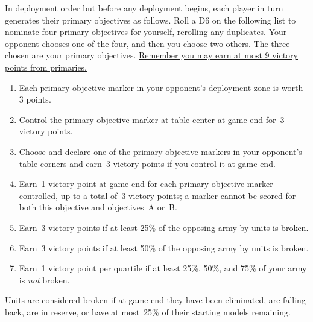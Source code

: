 \begin{scoring}  
\begin{primaries}

  In deployment order but before any deployment begins, each player in
  turn generates their primary objectives as follows.  Roll a D6 on
  the following list to nominate four primary objectives for yourself,
  rerolling any duplicates.  Your opponent chooses one of the four,
  and then you choose two others.  The three chosen are your primary
  objectives.  \underline{Remember you may earn at most 9 victory
    points from primaries.}

  \begin{enumerate}\shortlist
  \item Each primary objective marker in your opponent's deployment
    zone is worth 3 points.

  \item Control the primary objective marker at table center at game
    end for~3 victory points.

  \item Choose and declare one of the primary objective markers in
    your opponent's table corners and earn~3 victory points if you
    control it at game end.

  \item Earn~1 victory point at game end for each primary objective
    marker controlled, up to a total of~3 victory points; a marker
    cannot be scored for both this objective and objectives~A or~B.

  \item Earn~3 victory points if at least 25\% of the opposing army by
    units is broken.

  \item Earn~3 victory points if at least 50\% of the opposing army by
    units is broken.

  \item Earn~1 victory point per quartile if at least 25\%, 50\%, and
    75\% of your army is \emph{not} broken.
  \end{enumerate}

  Units are considered broken if at game end they have been
  eliminated, are falling back, are in reserve, or have at most~25\%
  of their starting models remaining.
\end{primaries}

\begin{secondaries}
\interrogation
\seekanddestroy
\reconnaissance
\breachpoints
\end{secondaries}

\end{scoring}
